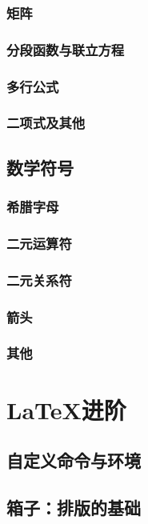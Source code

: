 {\subsection{矩阵}

\subsection{分段函数与联立方程}

\subsection{多行公式}

\subsection{二项式及其他}

\section{数学符号}
\subsection{希腊字母}

\subsection{二元运算符}

\subsection{二元关系符}

\subsection{箭头}

\subsection{其他}


\chapter{\LaTeX{}进阶}
\section{自定义命令与环境}
\label{sec:newcommand}
\section{箱子：排版的基础}
\label{sec:box}
}
